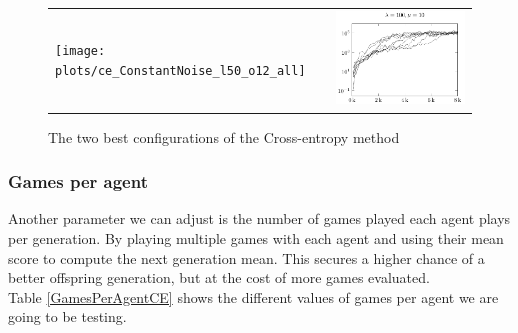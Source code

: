 \begin{changebar}
\begin{figure}[H]
\begin{tabular}{@{}l@{}l@{}}
\texttt{[image: plots/ce\_ConstantNoise\_l50\_o12\_all]} &
\includegraphics[scale=1]{plots/ce_ConstantNoise_l100_o10_all}
\end{tabular}
\caption{The two best configurations of the Cross-entropy method 
\label{fig:bestConfCE}}
\end{figure}
\end{changebar}

\subsubsection{Games per agent \label{GamesPerAgentCESection}}
Another parameter we can adjust is the number of 
games played each agent plays per generation. By playing
multiple games with each agent and using their 
mean score to compute the next generation mean. This
secures a higher chance of a better offspring generation,
but at the cost of more games
evaluated.\\
Table \ref{GamesPerAgentCE} shows the different values of
games per agent we are going to be
testing.

